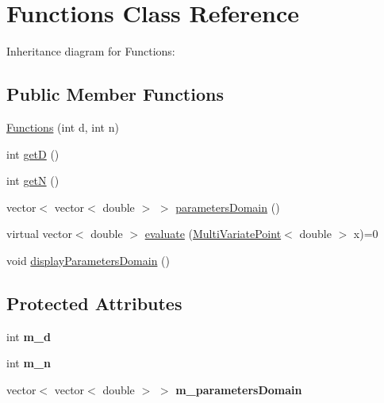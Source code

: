\hypertarget{class_functions}{}\section{Functions Class Reference}
\label{class_functions}


Inheritance diagram for Functions\+:
\subsection*{Public Member Functions}
\begin{DoxyCompactItemize}
\item 
\hyperlink{class_functions_a8475b67a879039ddb2a388af82c7971c}{Functions} (int d, int n)
\item 
int \hyperlink{class_functions_a6eeb7f57bfc87abca793f66fb8f77b50}{getD} ()
\item 
int \hyperlink{class_functions_a5433e199ad59640867e411a14bc5c43b}{getN} ()
\item 
vector$<$ vector$<$ double $>$ $>$ \hyperlink{class_functions_a8b30e9e921042f95c7a8c550f4149477}{parameters\+Domain} ()
\item 
virtual vector$<$ double $>$ \hyperlink{class_functions_a9d7bad8a6adacd8bd184a85a245e6168}{evaluate} (\hyperlink{class_multi_variate_point}{Multi\+Variate\+Point}$<$ double $>$ x)=0
\item 
void \hyperlink{class_functions_a26606b4a1be61670b6a2bd00896f4797}{display\+Parameters\+Domain} ()
\end{DoxyCompactItemize}
\subsection*{Protected Attributes}
\begin{DoxyCompactItemize}
\item 
int {\bfseries m\+\_\+d}\hypertarget{class_functions_a5a63717950c9b8eb955fa1d728edeb33}{}\label{class_functions_a5a63717950c9b8eb955fa1d728edeb33}

\item 
int {\bfseries m\+\_\+n}\hypertarget{class_functions_a094dbe8643b4622fc20091a4275de215}{}\label{class_functions_a094dbe8643b4622fc20091a4275de215}

\item 
vector$<$ vector$<$ double $>$ $>$ {\bfseries m\+\_\+parameters\+Domain}\hypertarget{class_functions_a619b9753408b91bb9e4e455724824cb6}{}\label{class_functions_a619b9753408b91bb9e4e455724824cb6}

\end{DoxyCompactItemize}


